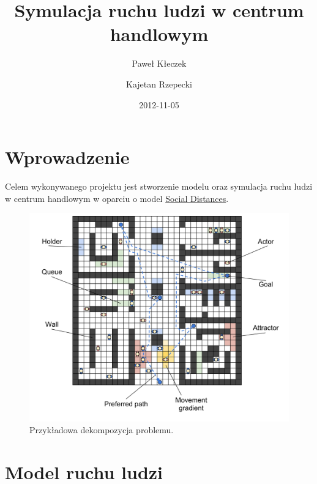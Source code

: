 \documentclass[a4paper, 12pt]{article}
\title{\textbf{Symulacja ruchu ludzi w centrum handlowym}}
\author{Paweł Kłeczek \and Kajetan Rzepecki}
\date{2012-11-05}
\begin{document}
    \vspace{\fill}
    \maketitle
    \vspace{\fill}
    \thispagestyle{empty}

\newpage
    \setcounter{page}{1}
    \setcounter{tocdepth}{3}
    \tableofcontents

\newpage
    \section{Wprowadzenie}
    \label{sec:intro}

    \noindent
    Celem wykonywanego projektu jest stworzenie modelu oraz symulacja ruchu ludzi w centrum handlowym w oparciu o model \hyperref[refs:social-distances-1]{Social Distances}.


    \begin{figure}[h!]
        \centering
        \includegraphics[scale=0.3]{./img/Overview.pdf}
        \caption{Przykładowa dekompozycja problemu.}
        \label{fig:overview}
    \end{figure}

\newpage
    \section{Model ruchu ludzi}
    \label{sec:model}
\end{document}
